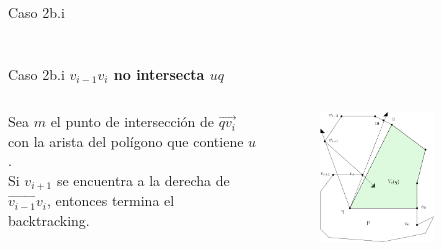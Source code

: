 \documentclass[aspectratio=169,xcolor=dvipsnames, t]{beamer}
\begin{document}
\begin{frame}{Caso 2b.i}
\begin{columns}
\begin{column}{0.45\textwidth}
\begin{figure}
        \end{figure}
    \end{column}
    \end{columns}
\end{frame}


\begin{frame}{Caso 2b.i}
    \textbf{$v_{i-1}v_{i}$ no intersecta $uq$}\\
    \vspace{0.5cm}
    \begin{columns}
    \begin{column}{0.45\textwidth}
        Sea $m$ el punto de intersección de $\overrightarrow{qv_{i}}$ con la arista del polígono que contiene $u$.\\
        \vspace{0.5cm}
        Si $v_{i+1}$ se encuentra a la derecha de $\overrightarrow{v_{i-1}v_{i}}$, entonces termina el backtracking.
    \end{column}
    \begin{column}{0.45\textwidth}  %
    \vspace{-2.5cm}
        \begin{figure}
            \centering
            \includegraphics[width=0.75\textwidth]{imagenes/Caso2.6a.png}
        \end{figure}
    \end{column}
    \end{columns}
\end{frame}
\end{document}
